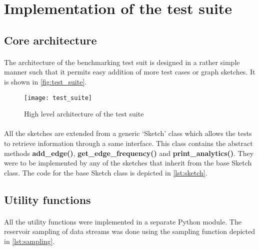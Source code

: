 \section{Implementation of the test suite}
\label{section:test_suite}

\subsection{Core architecture}

\paragraph{}
The architecture of the benchmarking test suit is designed in a rather simple manner such that it permits easy addition of more test cases or graph sketches. It is shown in \autoref{fig:test_suite}.

\begin{figure}[H]
    \centering \texttt{[image: test\_suite]}
    \caption{High level architecture of the test suite}
    \label{fig:test_suite}
\end{figure}

\paragraph{}
All the sketches are extended from a generic ‘Sketch’ class which allows the tests to retrieve information through a same interface. This class contains the abstract methods \textbf{add\_edge{()}}, \textbf{get\_edge\_frequency{()}} and \textbf{print\_analytics{()}}. They were to be implemented by any of the sketches that inherit from the base Sketch class. The code for the base Sketch class is depicted in \autoref{lst:sketch}.\\


\subsection{Utility functions}

\paragraph{}
All the utility functions were implemented in a separate Python module. The reservoir sampling of data streams was done using the sampling function depicted in \autoref{lst:sampling}.

